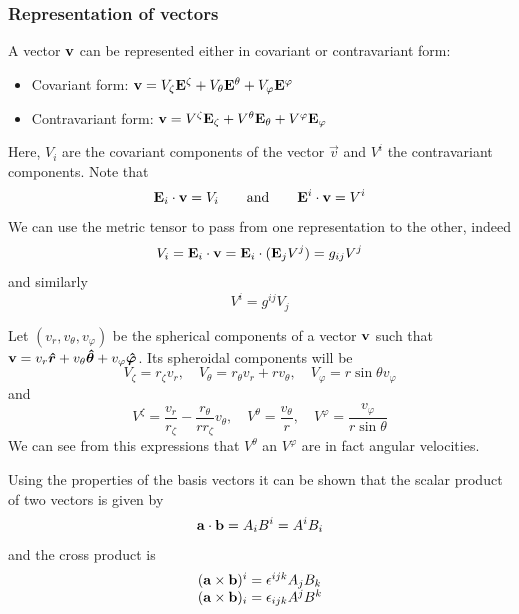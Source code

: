 \subsubsection{Representation of vectors}

A vector $\mathbf{v}$ can be represented either in covariant or contravariant form:
\begin{itemize}
\item Covariant form: $\mathbf{v}=V_\zeta\mathbf{E}^\zeta+V_\theta\mathbf{E}^\theta+V_\varphi\mathbf{E}^\varphi$
\item Contravariant form: $\mathbf{v}=V^\zeta\mathbf{E}_\zeta+V^\theta\mathbf{E}_\theta+V^\varphi\mathbf{E}_\varphi$
\end{itemize}
Here, $V_i$ are the covariant components of the vector $\vec v$ and $V^i$ the contravariant components. Note that
$$\mathbf{E}_i\cdot\mathbf{v}=V_i \qquad \mbox{and} \qquad \mathbf{E}^i\cdot\mathbf{v}=V^i$$
We can use the metric tensor to pass from one representation to the other, indeed
\begin{equation}
V_i=\mathbf{E}_i\cdot\mathbf{v}=\mathbf{E}_i\cdot(\mathbf{E}_j V^j)=g_{ij}V^j
\end{equation}
and similarly
\begin{equation}
V^i=g^{ij}V_j
\end{equation}

Let $(v_r,v_\theta,v_\varphi)$ be the spherical components of a vector $\mathbf{v}$ such that
$\mathbf{v}=v_r\boldsymbol{\hat r}+v_\theta\boldsymbol{\hat \theta}+v_\varphi\boldsymbol{\hat \varphi}$. Its spheroidal components will be
\begin{equation}
V_\zeta=r_\zeta v_r,\quad V_\theta=r_\theta v_r+r v_\theta,\quad
V_\varphi=r\sin\theta v_\varphi
\end{equation}
and
\begin{equation}
V^\zeta=\frac{v_r}{r_\zeta}-\frac{r_\theta}{rr_\zeta}v_\theta,\quad
V^\theta=\frac{v_\theta}{r},\quad V^\varphi=\frac{v_\varphi}{r\sin\theta}
\end{equation}
We can see from this expressions that $V^\theta$ an $V^\varphi$ are in fact angular velocities.


Using the properties of the basis vectors it can be shown that the scalar product of two vectors is
given by
\begin{equation}
\mathbf{a}\cdot\mathbf{b}=A_iB^i=A^iB_i
\end{equation}
and the cross product is
\begin{equation}
\begin{array}{l}
(\mathbf{a}\times\mathbf{b})^i=
\epsilon^{ijk}A_jB_k\\
(\mathbf{a}\times\mathbf{b})_i=
\epsilon_{ijk}A^jB^k
\end{array}
\end{equation}

